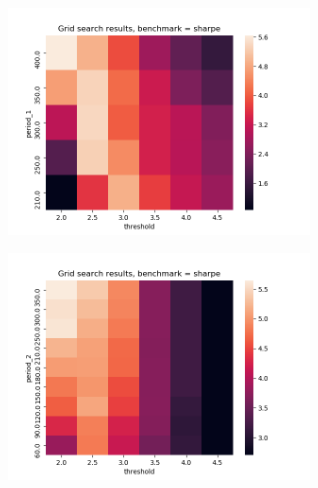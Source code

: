\begin{center}
	\centering
	\includegraphics[width=0.6\textwidth]{GridSearches/Average_Drawdown/Figure_2.png}
	\label{Average_Drawdown_2}
\end{center}

\begin{center}
	\centering
	\includegraphics[width=0.6\textwidth]{GridSearches/Average_Drawdown/Figure_3.png}
	\label{Average_Drawdown_3}
\end{center}
